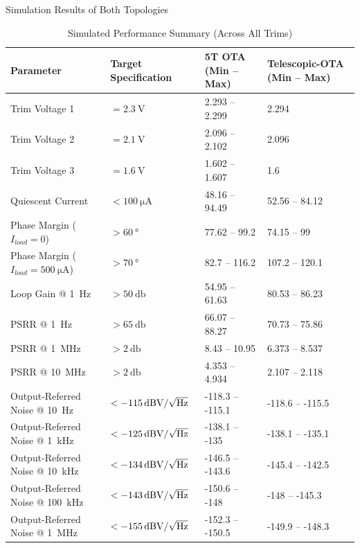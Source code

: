 \documentclass[10pt, aspectratio=169]{beamer}
\begin{document}
\begin{frame}{Simulation Results of Both Topologies}
    \begin{table}[t]
        \scriptsize
        \renewcommand{\arraystretch}{1.2}
        \label{tab:performance_summary}
        \centering
        \begin{tabularx}{\textwidth}{@{} X X @{} X X @{}}
            \toprule
            \textbf{Parameter} & \textbf{Target Specification} & \textbf{5T OTA (Min -- Max)} & \textbf{Telescopic-OTA (Min -- Max)}\\
            \midrule
            Trim Voltage 1 & $= \qty{2.3}{\volt}$ & 2.293 -- 2.299 & 2.294 \\
            Trim Voltage 2 & $= \qty{2.1}{\volt}$ & 2.096 -- 2.102 & 2.096 \\
            Trim Voltage 3 & $= \qty{1.6}{\volt}$ & 1.602 -- 1.607 & 1.6 \\
            Quiescent Current & $< \qty{100}{\micro\ampere}$ & 48.16 -- 94.49 & 52.56 -- 84.12 \\
            \midrule
            Phase Margin ($I_{load} = 0$) & $> \qty{60}{\degree}$ & 77.62 -- 99.2 & 74.15 -- 99 \\
            Phase Margin ($I_{load} = \qty{500}{\micro\ampere}$) & $> \qty{70}{\degree}$ & 82.7 -- 116.2 & 107.2 -- 120.1 \\
            \midrule
            Loop Gain @ \qty{1}{\hertz} & $> \qty{50}{\decibel}$ & 54.95 -- 61.63 & 80.53 -- 86.23 \\
            PSRR @ \qty{1}{\hertz} & $>\qty{65}{\decibel}$ & 66.07 -- 88.27 & 70.73 -- 75.86 \\
            PSRR @ \qty{1}{\mega\hertz} & $>\qty{2}{\decibel}$ & 8.43 -- 10.95 & 6.373 -- 8.537 \\
            PSRR @ \qty{10}{\mega\hertz} & $>\qty{2}{\decibel}$ & 4.353 -- 4.934 & 2.107 -- 2.118 \\
            \midrule
            Output-Referred Noise @ \qty{10}{\hertz} & $<-\qty{115}{\decibel\volt\slash\sqrt{\Hz}}$ & -118.3 -- -115.1 & -118.6 -- -115.5 \\
            Output-Referred Noise @ \qty{1}{\kilo\hertz} & $<-\qty{125}{\decibel\volt\slash\sqrt{\Hz}}$ & -138.1 -- -135 & -138.1 -- -135.1 \\
            Output-Referred Noise @ \qty{10}{\kilo\hertz} & $<-\qty{134}{\decibel\volt\slash\sqrt{\Hz}}$ & -146.5 -- -143.6 & -145.4 -- -142.5 \\
            Output-Referred Noise @ \qty{100}{\kilo\hertz} & $<-\qty{143}{\decibel\volt\slash\sqrt{\Hz}}$ & -150.6 -- -148 & -148 -- -145.3 \\
            Output-Referred Noise @ \qty{1}{\mega\hertz} & $<-\qty{155}{\decibel\volt\slash\sqrt{\Hz}}$ & -152.3 -- -150.5 & -149.9 -- -148.3 \\
            \bottomrule
        \end{tabularx}
        \caption{Simulated Performance Summary (Across All Trims)}
    \end{table}
\end{frame}
\end{document}
